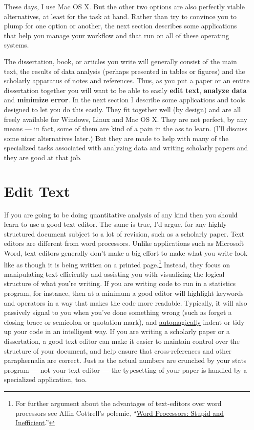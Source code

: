 \documentclass[11pt,article,oneside]{memoir}
\begin{document}
These days, I use Mac OS X. But the other two options are also perfectly viable alternatives, at least for the task at hand. Rather than try to convince you to plump for one option or another, the next section describes some applications that help you manage your workflow and that run on all of these operating systems.

The dissertation, book, or articles you write will generally consist of the main text, the results of data analysis (perhaps presented in tables or figures) and the scholarly apparatus of notes and references. Thus, as you  put a paper or an entire dissertation together you will want to be able to easily \textbf{edit text}, \textbf{analyze data} and \textbf{minimize error}. In the next section I describe some applications and tools designed to let you do this easily. They fit together well (by design) and are all freely available for Windows, Linux and Mac OS X. They are not perfect, by any means --- in fact, some of them are kind of a pain in the ass to learn. (I'll discuss some nicer alternatives later.) But they are made to help with many of the specialized tasks associated with analyzing data and writing scholarly papers and they are good at that job.                                                      

\section{Edit Text}
If you are going to be doing quantitative analysis of any kind then you should learn to use a good text editor. The same is true, I'd argue, for any highly structured document subject to a lot of revision, such as a scholarly paper. Text editors are different from word processors. Unlike applications such as Microsoft Word, text editors generally don't make a big effort to make what you write look like as though it is being written on a printed page.\footnote{For further argument about the advantages of text-editors over word processors see Allin Cottrell's polemic, ``\href{http://www.ecn.wfu.edu/~cottrell/wp.html}{Word Processors: Stupid and Inefficient}.''} Instead, they focus on manipulating text efficiently and assisting you with visualizing the logical structure of what you're writing. If you are writing code to run in a statistics program, for instance, then at a minimum a good editor will highlight keywords and operators in a way that makes the code more readable. Typically, it will also passively signal to you when you've done something wrong (such as forget a closing brace or semicolon or quotation mark), and    \href{http://en.wiktionary.org/wiki/automagical}{automagically} indent or tidy up your code in an intelligent way. If you are writing a scholarly paper or a dissertation, a good text editor can make it easier to maintain control over the structure of your document, and help ensure that cross-references and other paraphernalia are correct. Just as the actual numbers are crunched by your stats program --- not your text editor --- the typesetting of your paper is handled by a specialized application, too.
\end{document}
